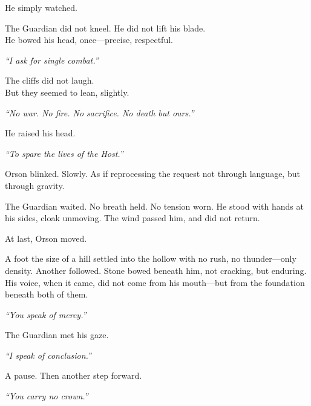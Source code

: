 \documentclass[9pt]{article}
\begin{document}
\vspace{0.5em}
He simply watched.

\vspace{0.5em}
The Guardian did not kneel. He did not lift his blade.\\
He bowed his head, once---precise, respectful.

\vspace{0.5em}
\textit{``I ask for single combat.''}

\vspace{0.5em}
The cliffs did not laugh.\\
But they seemed to lean, slightly.

\vspace{0.5em}
\textit{``No war. No fire. No sacrifice. No death but ours.''}

\vspace{0.5em}
He raised his head.

\vspace{0.5em}
\textit{``To spare the lives of the Host.''}

\vspace{0.5em}
Orson blinked. Slowly. As if reprocessing the request not through language, but through gravity.

\vspace{0.5em}
The Guardian waited. No breath held. No tension worn. He stood with hands at his sides, cloak unmoving. The wind passed him, and did not return.

\vspace{0.5em}
At last, Orson moved.

\vspace{0.5em}
A foot the size of a hill settled into the hollow with no rush, no thunder---only density. Another followed. Stone bowed beneath him, not cracking, but enduring. His voice, when it came, did not come from his mouth---but from the foundation beneath both of them.

\vspace{0.5em}
\textit{``You speak of mercy.''}

\vspace{0.5em}
The Guardian met his gaze.

\vspace{0.5em}
\textit{``I speak of conclusion.''}

\vspace{0.5em}
A pause. Then another step forward.

\vspace{0.5em}
\textit{``You carry no crown.''}
\end{document}
